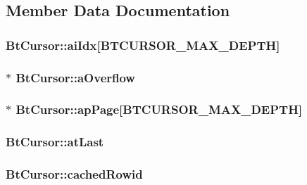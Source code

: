 \subsection{Member Data Documentation}
\hypertarget{struct_bt_cursor_a037a739198de5bee22ca203d34e90af1}{
\subsubsection[{ai\-Idx}]{ Bt\-Cursor\-::ai\-Idx\mbox{[}{\bf B\-T\-C\-U\-R\-S\-O\-R\-\_\-\-M\-A\-X\-\_\-\-D\-E\-P\-T\-H}\mbox{]}}}\label{struct_bt_cursor_a037a739198de5bee22ca203d34e90af1}
\hypertarget{struct_bt_cursor_ae2dbcc15e63d349774a7ad6caef4d096}{
\subsubsection[{a\-Overflow}]{$\ast$ Bt\-Cursor\-::a\-Overflow}}\label{struct_bt_cursor_ae2dbcc15e63d349774a7ad6caef4d096}
\hypertarget{struct_bt_cursor_ad3414d944f9578e86e26c6158f92096b}{
\subsubsection[{ap\-Page}]{$\ast$ Bt\-Cursor\-::ap\-Page\mbox{[}{\bf B\-T\-C\-U\-R\-S\-O\-R\-\_\-\-M\-A\-X\-\_\-\-D\-E\-P\-T\-H}\mbox{]}}}\label{struct_bt_cursor_ad3414d944f9578e86e26c6158f92096b}
\hypertarget{struct_bt_cursor_afff41eb594a5fc2c20b13232e6ff9689}{
\subsubsection[{at\-Last}]{ Bt\-Cursor\-::at\-Last}}\label{struct_bt_cursor_afff41eb594a5fc2c20b13232e6ff9689}
\hypertarget{struct_bt_cursor_ad66b1a006f910aeb12de1e93d9a84cff}{
\subsubsection[{cached\-Rowid}]{ Bt\-Cursor\-::cached\-Rowid}}\label{struct_bt_cursor_ad66b1a006f910aeb12de1e93d9a84cff}
